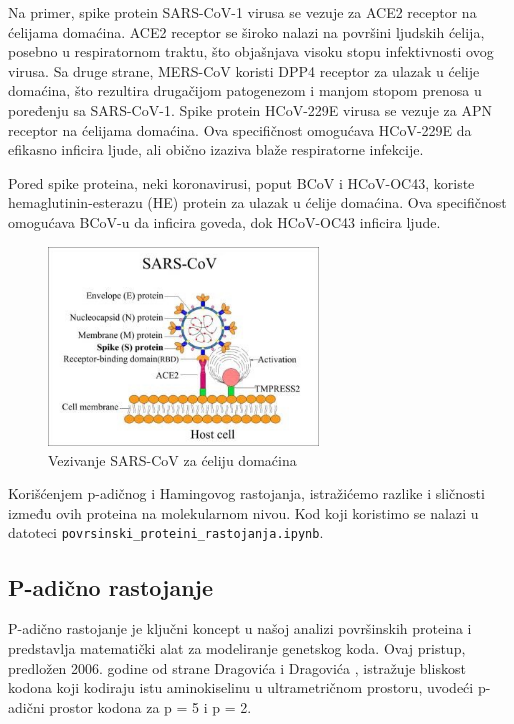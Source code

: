 \documentclass[a4paper,12pt]{article}
\begin{document}
\bigskip
Na primer, spike protein SARS-CoV-1 virusa se vezuje za ACE2 receptor na ćelijama domaćina. ACE2 receptor se široko nalazi na površini ljudskih ćelija, posebno u respiratornom traktu, što objašnjava visoku stopu infektivnosti ovog virusa. Sa druge strane, MERS-CoV koristi DPP4 receptor za ulazak u ćelije domaćina, što rezultira drugačijom patogenezom i manjom stopom prenosa u poređenju sa SARS-CoV-1.
Spike protein HCoV-229E virusa se vezuje za APN receptor na ćelijama domaćina. Ova specifičnost omogućava HCoV-229E da efikasno inficira ljude, ali obično izaziva blaže respiratorne infekcije. 

\smallskip
Pored spike proteina, neki koronavirusi, poput BCoV i HCoV-OC43, koriste hemaglutinin-esterazu (HE) protein za ulazak u ćelije domaćina. Ova specifičnost omogućava BCoV-u da inficira goveda, dok HCoV-OC43 inficira ljude.

\smallskip
\begin{figure}[h!]
  \centering
  \includegraphics[width=0.64\textwidth]{slika7.jpeg}
  \caption{Vezivanje SARS-CoV za ćeliju domaćina}
  \label{fig:my_label}
\end{figure}

\bigskip
Korišćenjem p-adičnog i Hamingovog rastojanja, istražićemo razlike i sličnosti između ovih proteina na molekularnom nivou. Kod koji koristimo se nalazi u datoteci \texttt{povrsinski\_proteini\_rastojanja.ipynb}.


\newpage
\subsection{P-adično rastojanje}
P-adično rastojanje je ključni koncept u našoj analizi površinskih proteina i predstavlja matematički alat za modeliranje genetskog koda. Ovaj pristup, predložen 2006. godine od strane Dragovića i Dragovića \cite{dragovic2006}, istražuje bliskost kodona koji kodiraju istu aminokiselinu u ultrametričnom prostoru, uvodeći p-adični prostor kodona za p = 5 i p = 2. 
\end{document}
